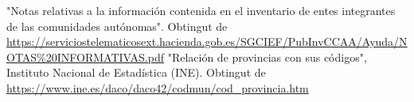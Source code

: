 \documentclass[12pt]{article}
\begin{document}
\newpage
\begin{thebibliography}{9}
    "Notas relativas a la información contenida en el inventario de entes integrantes de las comunidades autónomas". Obtingut de \url{https://serviciostelematicosext.hacienda.gob.es/SGCIEF/PubInvCCAA/Ayuda/NOTAS\%20INFORMATIVAS.pdf}
    "Relación de provincias con sus códigos", Instituto Nacional de Estadística (INE). Obtingut de \url{https://www.ine.es/daco/daco42/codmun/cod_provincia.htm}

\end{thebibliography}
\end{document}
